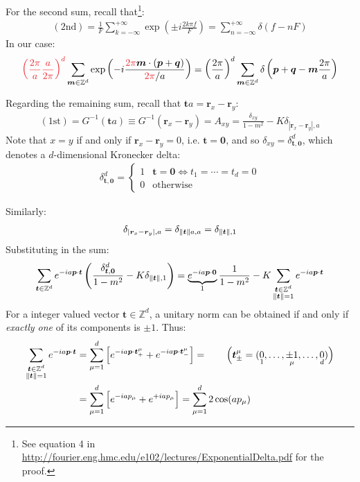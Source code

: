 \documentclass[../../main.tex]{subfiles}
\begin{document}
For the second sum, recall that\footnote{See equation 4 in \url{http://fourier.eng.hmc.edu/e102/lectures/ExponentialDelta.pdf} for the proof.}:
\begin{align*}
    (2\mathrm{nd}) = \frac{1}{F} \sum_{k=-\infty}^{+\infty}  \exp\left(\pm i \frac{2k \pi f}{F} \right) = \sum_{n=-\infty}^{+\infty} \delta(f- n F)
\end{align*}
In our case:
\begin{align*}
    \textcolor{Red}{\left(\frac{2\pi}{a} \frac{a}{2\pi}\right)^d}\sum_{\bm{m} \in \mathbb{Z}^d} \exp\left(-i\frac{\textcolor{Red}{2 \pi} \bm{m} \cdot (\bm{p} + \bm{q})}{\textcolor{Red}{2\pi}/a} \right) = \left(\frac{2\pi}{a} \right)^d \sum_{\bm{m} \in \mathbb{Z}^d} \delta\left(\bm{p}+\bm{q}-\bm{m} \frac{2\pi}{a} \right)
\end{align*}

Regarding the remaining sum, recall that $\bm{t}a = \bm{r}_x-\bm{r}_y$:
\begin{align*}
    (1\mathrm{st}) = G^{-1}(\bm{t}a) \equiv G^{-1}(\bm{r}_x - \bm{r}_y) = A_{xy} = \frac{\delta_{xy}}{1-m^2} -K \delta_{|\bm{r}_x-\bm{r}_y|,a} 
\end{align*}
Note that $x=y$ if and only if $\bm{r}_x - \bm{r}_y = 0$, i.e. $\bm{t}=\bm{0}$, and so $\delta_{xy} = \delta^d_{\bm{t},\bm{0}}$, which denotes a $d$-dimensional Kronecker delta:
\begin{align*}
    \delta^d_{\bm{t},\bm{0}} = \begin{cases}
        1 & \bm{t} = \bm{0} \Leftrightarrow t_1 = \cdots = t_d = 0\\
        0 & \text{otherwise}
    \end{cases}
\end{align*}

Similarly:
\begin{align*}
    \delta_{|\bm{r}_x - \bm{r}_y|,a} = \delta_{\norm{\bm{t}}a, a} =\delta_{\norm{\bm{t}},1}
\end{align*}
Substituting in the sum:
\begin{align*}
    \sum_{\bm{t} \in \mathbb{Z}^d} e^{-i a \bm{p} \cdot \bm{t}} \left( \frac{\delta^d_{\bm{t},\bm{0}}}{1-m^2} - K \delta_{\norm{\bm{t}},1} \right) = \underbrace{e^{-i a \bm{p} \cdot \bm{0}}}_{1} \frac{1}{1-m^2} - K \sum_{\substack{\bm{t} \in \mathbb{Z}^d\\\norm{\bm{t}} = 1}} e^{-i a \bm{p} \cdot \bm{t}}
\end{align*}
For a integer valued vector $\bm{t} \in \mathbb{Z}^d$, a unitary norm can be obtained if and only if \textit{exactly one} of its components is $\pm 1$. Thus:
\begin{align*}
    \sum_{\substack{\bm{t} \in \mathbb{Z}^d\\
    \norm{\bm{t}} = 1}} e^{-i a \bm{p} \cdot \bm{t}} &= \sum_{\mu=1}^d \Big[ e^{-i a \bm{p} \cdot \bm{t}^\mu_+} + e^{-i a \bm{p} \cdot \bm{t}^\mu_-} \Big]= \qquad \Big(\bm{t}^\mu_\pm = (\underset{1}{0} ,\dots,\underset{\mu}{\pm1} ,\dots,\underset{d}{0} ) \Big)\\
    &= \sum_{\mu=1}^d \Big[ e^{-i a p_\mu} + e^{+i a p_\mu} \Big] = \sum_{\mu=1}^d 2 \cos(a p_\mu)
\end{align*} 
\end{document}
